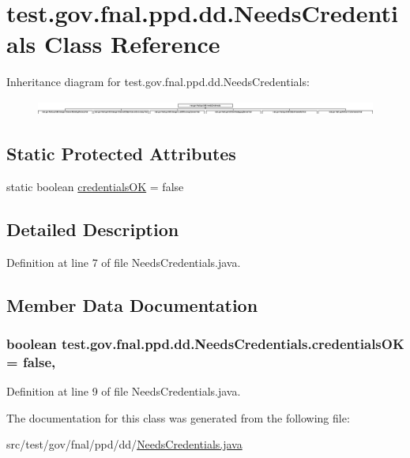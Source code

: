 \hypertarget{classtest_1_1gov_1_1fnal_1_1ppd_1_1dd_1_1NeedsCredentials}{\section{test.\-gov.\-fnal.\-ppd.\-dd.\-Needs\-Credentials Class Reference}
\label{classtest_1_1gov_1_1fnal_1_1ppd_1_1dd_1_1NeedsCredentials}
}
Inheritance diagram for test.\-gov.\-fnal.\-ppd.\-dd.\-Needs\-Credentials\-:\begin{figure}[H]
\begin{center}
\leavevmode
\includegraphics[height=0.478632cm]{classtest_1_1gov_1_1fnal_1_1ppd_1_1dd_1_1NeedsCredentials}
\end{center}
\end{figure}
\subsection*{Static Protected Attributes}
\begin{DoxyCompactItemize}
\item 
static boolean \hyperlink{classtest_1_1gov_1_1fnal_1_1ppd_1_1dd_1_1NeedsCredentials_a2db70b93bc3c6d68e11319152311d616}{credentials\-O\-K} = false
\end{DoxyCompactItemize}


\subsection{Detailed Description}


Definition at line 7 of file Needs\-Credentials.\-java.



\subsection{Member Data Documentation}
\hypertarget{classtest_1_1gov_1_1fnal_1_1ppd_1_1dd_1_1NeedsCredentials_a2db70b93bc3c6d68e11319152311d616}{
\subsubsection[{credentials\-O\-K}]{\setlength{\rightskip}{0pt plus 5cm}boolean test.\-gov.\-fnal.\-ppd.\-dd.\-Needs\-Credentials.\-credentials\-O\-K = false\hspace{0.3cm}{\ttfamily [static]}, {\ttfamily [protected]}}}\label{classtest_1_1gov_1_1fnal_1_1ppd_1_1dd_1_1NeedsCredentials_a2db70b93bc3c6d68e11319152311d616}


Definition at line 9 of file Needs\-Credentials.\-java.



The documentation for this class was generated from the following file\-:\begin{DoxyCompactItemize}
\item 
src/test/gov/fnal/ppd/dd/\hyperlink{NeedsCredentials_8java}{Needs\-Credentials.\-java}\end{DoxyCompactItemize}

